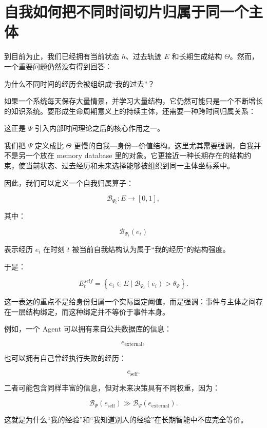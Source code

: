 \section{自我如何把不同时间切片归属于同一个主体}

到目前为止，我们已经拥有当前状态 $h$、过去轨迹 $E$ 和长期生成结构 $\Theta$。然而，一个重要问题仍然没有得到回答：

为什么不同时间的经历会被组织成“我的过去”？

如果一个系统每天保存大量情景，并学习大量结构，它仍然可能只是一个不断增长的知识系统。要形成生命周期意义上的持续主体，还需要一种跨时间归属关系：

\begin{statementbox}
\centering
{}
\end{statementbox}

这正是 $\Psi$ 引入内部时间理论之后的核心作用之一。

我们把 $\Psi$ 定义成比 $\Theta$ 更慢的自我—身份—价值结构。这里尤其需要强调，自我并不是另一个放在 memory database 里的对象。它更接近一种长期存在的结构约束，使当前状态、过去经历和未来选择能够被组织到同一主体坐标系中。

因此，我们可以定义一个自我归属算子：

\[
\mathcal{B}_{\Psi_t}
:
E
\rightarrow
[0,1],
\]

其中：

\[
\mathcal{B}_{\Psi_t}(e_i)
\]

表示经历 $e_i$ 在时刻 $t$ 被当前自我结构认为属于“我的经历”的结构强度。

于是：

\[
E^{self}_t
=
\left\{
e_i
\in E
\mid
\mathcal{B}_{\Psi_t}(e_i)>\theta_{\Psi}
\right\}.
\]

这一表达的重点不是给身份归属一个实际固定阈值，而是强调：事件与主体之间存在一层结构绑定，而这种绑定并不等价于事件本身。

例如，一个 Agent 可以拥有来自公共数据库的信息：

\[
e_{\mathrm{external}},
\]

也可以拥有自己曾经执行失败的经历：

\[
e_{\mathrm{self}}.
\]

二者可能包含同样丰富的信息，但对未来决策具有不同权重，因为：

\[
\mathcal{B}_{\Psi}(e_{\mathrm{self}})
\gg
\mathcal{B}_{\Psi}(e_{\mathrm{external}}).
\]

这就是为什么“我的经验”和“我知道别人的经验”在长期智能中不应完全等价。

